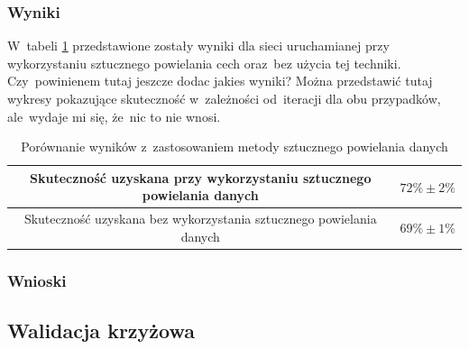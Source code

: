 \subsubsection{Wyniki}
W~tabeli \ref{table:catdogs} przedstawione zostały wyniki dla sieci uruchamianej przy wykorzystaniu sztucznego powielania cech oraz~bez użycia tej techniki. Czy~powinienem tutaj jeszcze dodac jakies wyniki? Można przedstawić tutaj wykresy pokazujące skuteczność w~zależności od~iteracji dla obu przypadków, ale~wydaje mi się, że~nic to nie wnosi.

\begin{table}
\centering
\begin{tabular}{|c|c|}
\hline
Skuteczność uzyskana przy wykorzystaniu sztucznego powielania danych & $72\% \pm 2\%$ \\
\hline 
Skuteczność uzyskana bez wykorzystania sztucznego powielania danych & $69\% \pm 1\%$ \\
\hline 
 \end{tabular}
 \caption{Porównanie wyników z~zastosowaniem metody sztucznego powielania danych} \label{table:catdogs}
\end{table}

\subsubsection{Wnioski}

\subsection{Walidacja krzyżowa}
